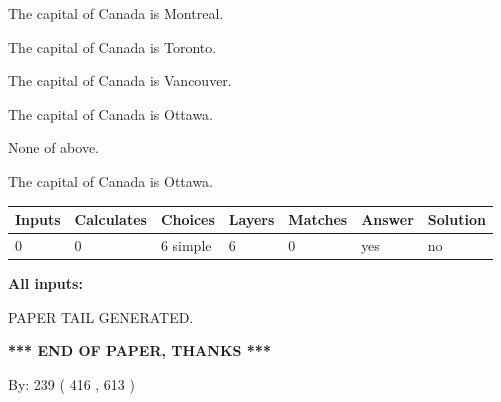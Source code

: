 \documentclass[12pt]{article}
\begin{document}
 
The capital of Canada is Montreal.
 
 
The capital of Canada is Toronto.
 
 
The capital of Canada is Vancouver.
 
 
The capital of Canada is Ottawa.
 
 
 None of above.
 
 
\noindent{}
 
 
The capital of Canada is Ottawa.
 
 
\noindent{}
 
 
   
   
   
   
\noindent\begin{tabular}{|l|l|l|l|l|l|l|}
 \hline
Inputs & Calculates & Choices & Layers & Matches & Answer & Solution \\ \hline
 0  & 
 0  & 
 6
  simple  
  & 
 6  & 
 0  & 
  yes & 
  no 
  \\ \hline
 \end{tabular}
   
   
   
   
\noindent{}
   
   
   
   
\noindent\vspace{0.1in}\hspace{-0.08in} {\textbf{\Large{All inputs: }}}
   
   
   
   
   
   
 \vspace{0.2in}
 
   
   
\vspace{2.0in} PAPER TAIL GENERATED.
   
   
   
   
\vspace{1.0in} 
{\textbf{\large{ *** END OF PAPER, THANKS *** }}} 
   
   
\hspace{1.0in} By: 
 239 ( 416 ,  613 )
   
\end{document}
